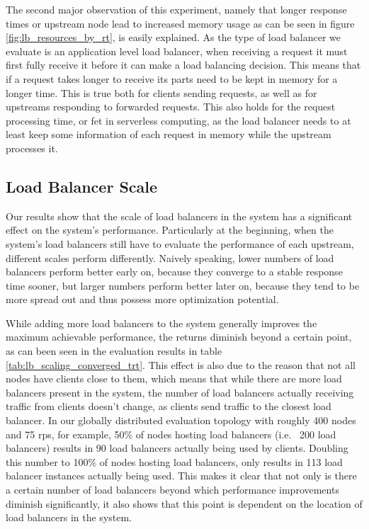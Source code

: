 \documentclass[draft,final]{vutinfth} %
\begin{document}
The second major observation of this experiment, namely that longer response times or upstream node lead to increased memory usage as can be seen in figure \ref{fig:lb_resources_by_rt}, is  easily explained.
As the type of load balancer we evaluate is an application level load balancer, when receiving a request it must first fully receive it before it can make a load balancing decision.
This means that if a request takes longer to receive its parts need to be kept in memory for a longer time.
This is true both for clients sending requests, as well as for upstreams responding to forwarded requests.
This also holds for the request processing time, or \gls{fet} in serverless computing, as the load balancer needs to at least keep some information of each request in memory while the upstream processes it.




\subsection{Load Balancer Scale}
Our results show that the scale of load balancers in the system has a significant effect on the system's performance.
Particularly at the beginning, when the system's load balancers still have to evaluate the performance of each upstream, different scales perform differently.
Naively speaking, lower numbers of load balancers perform better early on, because they converge to a stable response time sooner, but larger numbers perform better later on, because they tend to be more spread out and thus possess more optimization potential.

While adding more load balancers to the system generally improves the maximum achievable performance, the returns diminish beyond a certain point, as can been seen in the evaluation results in table \ref{tab:lb_scaling_converged_trt}.
This effect is also due to the reason that not all nodes have clients close to them, which means that while there are more load balancers present in the system, the number of load balancers actually receiving traffic from clients doesn't change, as clients send traffic to the closest load balancer.
In our globally distributed evaluation topology with roughly 400 nodes and 75 \gls{rps}, for example, 50\% of nodes hosting load balancers (i.e. ~200 load balancers) results in 90 load balancers actually being used by clients. Doubling this number to 100\% of nodes hosting load balancers, only results in 113 load balancer instances actually being used.
This makes it clear that not only is there a certain number of load balancers beyond which performance improvements diminish significantly, it also shows that this point is dependent on the location of load balancers in the system.
\end{document}
